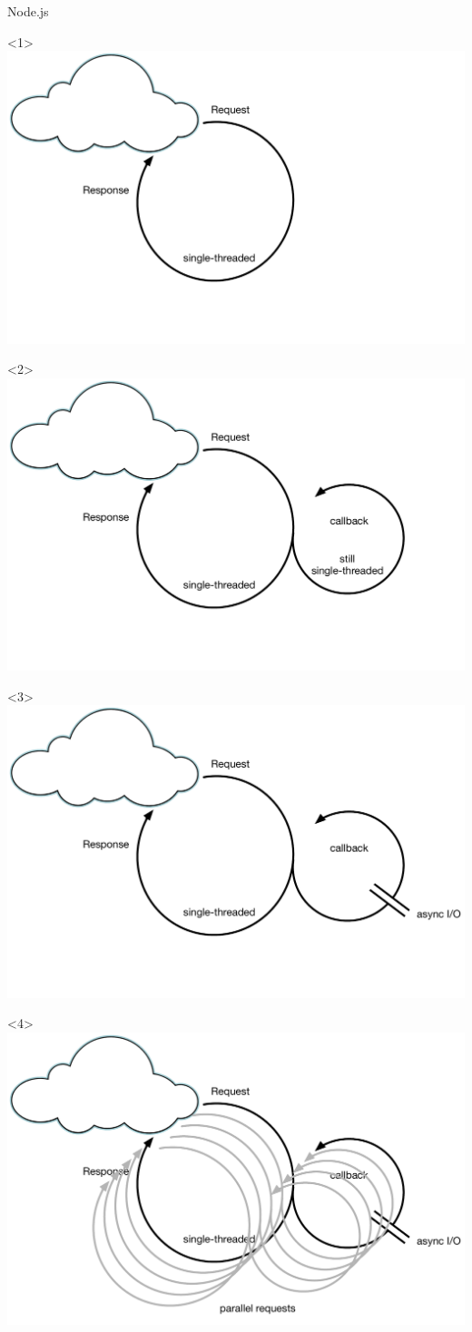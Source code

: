 \begin{frame}[fragile]{Node.js}

\begin{onlyenv}<1>
\includegraphics[width=.7\textwidth]{../Nodejs1.pdf}
\end{onlyenv}

\begin{onlyenv}<2>
\includegraphics[width=.7\textwidth]{../Nodejs2.pdf}
\end{onlyenv}

\begin{onlyenv}<3>
\includegraphics[width=.7\textwidth]{../Nodejs3.pdf}
\end{onlyenv}

\begin{onlyenv}<4>
\includegraphics[width=.7\textwidth]{../Nodejs4.pdf}
\end{onlyenv}


\end{frame}
